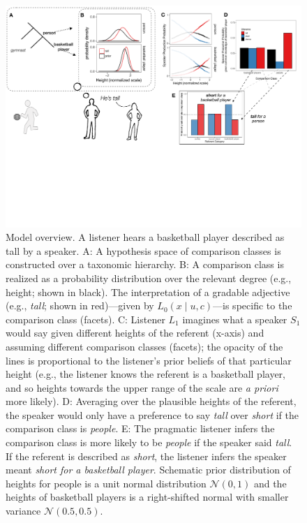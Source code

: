 \documentclass[doc, floatsintext]{apa6}
\begin{document}
\begin{figure}[!ht]
\centering
\includegraphics[width=\textwidth]{figs/model_cartoon.pdf}
\caption{\small \label{fig:modelCartoon}Model overview. A listener hears a basketball player described as tall by a speaker. A: A hypothesis space of comparison classes is constructed over a taxonomic hierarchy. B: A comparison class is realized as a probability distribution over the relevant degree (e.g., height; shown in black). The interpretation of a gradable adjective (e.g., \emph{tall}; shown in red)---given by $L_{0}(x \mid u, c)$---is specific to the comparison class (facets). C: Listener $L_1$ imagines what a speaker $S_1$ would say given different heights of the referent (x-axis) and assuming different comparison classes (facets); the opacity of the lines is proportional to the listener's prior beliefs of that particular height (e.g., the listener knows the referent is a basketball player, and so heights towards the upper range of the scale are \emph{a priori} more likely). D: Averaging over the plausible heights of the referent, the speaker would only have a preference to say \emph{tall} over \emph{short} if the comparison class is \emph{people}. E: The pragmatic listener infers the comparison class is more likely to be \emph{people} if the speaker said \emph{tall}. If the referent is described as \emph{short}, the listener infers the speaker meant \emph{short for a basketball player}. Schematic prior distribution of heights for people is a unit normal distribution $\mathcal{N}(0, 1)$ and the heights of basketball players is a right-shifted normal with smaller variance $\mathcal{N}(0.5, 0.5)$.
}
\end{figure}
\end{document}
